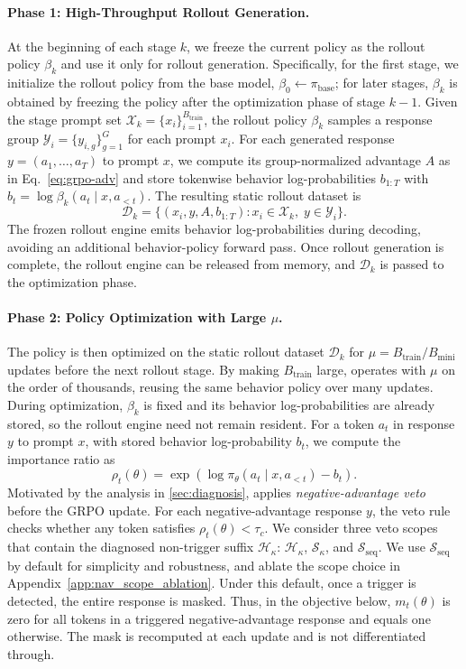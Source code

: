 \paragraph{Phase 1: High-Throughput Rollout Generation.}
\label{paragraph:phase1}
At the beginning of each stage $k$, we freeze the current policy as the rollout
policy $\beta_k$ and use it only for rollout generation. Specifically, for the
first stage, we initialize the rollout policy from the base model,
$\beta_0 \leftarrow \pi_{\text{base}}$; for later stages, $\beta_k$ is obtained
by freezing the policy after the optimization phase of stage $k-1$. 
Given the stage prompt set $\mathcal{X}_k=\{x_i\}_{i=1}^{B_{\mathrm{train}}}$,
the rollout policy $\beta_k$ samples a response group
$\mathcal Y_i=\{y_{i,g}\}_{g=1}^G$ for each prompt $x_i$.
For each generated response $y=(a_1,\ldots,a_T)$ to prompt $x$, we compute its
group-normalized advantage $A$ as in Eq.~\ref{eq:grpo-adv} and store tokenwise
behavior log-probabilities $b_{1:T}$ with
$b_t=\log\beta_k(a_t\mid x,a_{<t})$.
The resulting static rollout dataset is
\[
\mathcal D_k=\{(x_i, y, A, b_{1:T}) : x_i\in\mathcal X_k,\; y\in\mathcal Y_i\}.
\]
The frozen rollout engine emits behavior log-probabilities during decoding, avoiding an additional behavior-policy forward pass. Once rollout generation is complete, the rollout engine can be
released from memory, and $\mathcal D_k$ is passed to the optimization phase.


\paragraph{Phase 2: Policy Optimization with Large \boldmath $\mu$.}
\label{paragraph:phase2}

The policy is then optimized on the static rollout dataset $\mathcal D_k$ for $\mu=B_{\mathrm{train}}/B_{\mathrm{mini}}$ updates before the next rollout
stage. By making $B_{\mathrm{train}}$ large, \ourmethod{} operates with
$\mu$ on the order of thousands, reusing the same behavior policy over many updates. During optimization, $\beta_k$ is fixed and its behavior log-probabilities are already stored, so the rollout engine need not remain resident. For a token $a_t$ in response $y$ to prompt $x$, with stored behavior log-probability $b_t$, we compute the importance ratio as
\[
    \rho_t(\theta)
    =
    \exp\left(
        \log \pi_\theta(a_t\mid x,a_{<t}) - b_t
    \right).
\]
Motivated by the analysis in \cref{sec:diagnosis}, \ourmethod{} applies
\textit{negative-advantage veto} before the GRPO update. For each negative-advantage
response $y$, the veto rule checks whether any token satisfies
$\rho_t(\theta)<\tau_c$. We consider three veto scopes that contain the diagnosed non-trigger suffix
$\mathcal H_\kappa$: $\mathcal H_\kappa$, $\mathcal S_\kappa$, and
$\mathcal S_{\mathrm{seq}}$. We use $\mathcal S_{\mathrm{seq}}$ by default for simplicity and robustness, and ablate the scope choice in Appendix~\ref{app:nav_scope_ablation}. Under this default, once a trigger is detected, the entire response is masked. Thus, in the objective below, $m_{t}(\theta)$ is zero
for all tokens in a triggered negative-advantage response and equals one otherwise.
The mask is recomputed at each update and is not differentiated through. 

